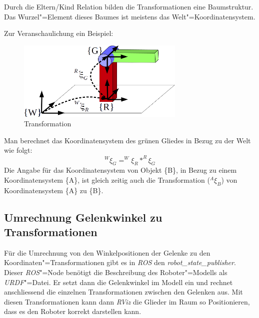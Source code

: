 Durch die Eltern/Kind Relation bilden die Transformationen eine Baumstruktur.
Das Wurzel"=Element dieses Baumes ist meistens das Welt"=Koordinatensystem.


Zur Veranschaulichung ein Beispiel: %
\begin{figure}[ht!]
	\centering
	\includegraphics[width=8cm]{images/Transformation.png}
	\caption{Transformation}
	\label{Ab:transformation}
\end{figure}

Man berechnet das Koordinatensystem des grünen Gliedes in Bezug zu der Welt wie folgt:
\begin{equation}
^{W}\xi_{G} = ^{W}\xi_{R} * ^{R}\xi_{G}
\end{equation}
Die Angabe für das Koordinatensystem von Objekt \{B\}, in Bezug zu einem Koordinatensystem \{A\}, ist gleich zeitig auch die Transformation ($^{A}\xi_{B}$) von Koordinatensystem \{A\} zu \{B\}.

\subsection{Umrechnung Gelenkwinkel zu Transformationen}
\label{chap:robot-state-publiseher}
Für die Umrechnung von den Winkelpositionen der Gelenke zu den Koordinaten"=Transformationen gibt es in \textit{ROS} den \textit{robot\_state\_publisher}.
Dieser \textit{ROS}"=Node benötigt die Beschreibung des Roboter"=Modells als \textit{URDF}"=Datei.
Er setzt dann die Gelenkwinkel im Modell ein und rechnet anschliessend die einzelnen Transformationen zwischen den Gelenken aus.
Mit diesen Transformationen kann dann \textit{RViz} die Glieder im Raum so Positionieren, dass es den Roboter korrekt darstellen kann.







